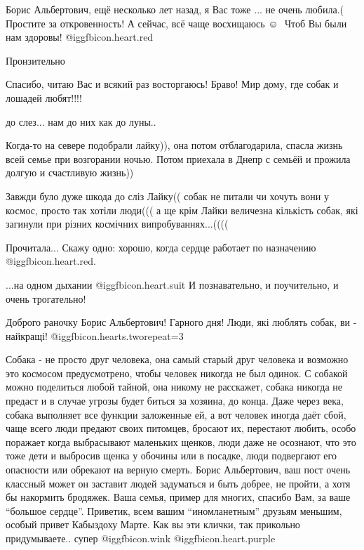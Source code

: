 \begin{itemize}

Борис Альбертович,
ещё несколько лет назад, я Вас тоже ...
не очень любила.(
Простите за откровенность!
А сейчас, всё чаще восхищаюсь ☺ ️ 
Чтоб Вы были нам здоровы!  @igg{fbicon.heart.red}

Пронзительно

Спасибо, читаю Вас и всякий раз восторгаюсь! Браво! Мир дому, где собак и лошадей любят!!!!

до слез... нам до них как до луны..


Когда-то на севере подобрали лайку)), она потом отблагодарила, спасла жизнь
всей семье при возгорании ночью. Потом приехала в Днепр с семьёй и прожила
долгую и счастливую жизнь))


Завжди було дуже шкода до сліз Лайку(( собак не питали чи хочуть вони у космос,
просто так хотіли люди((( а ще крім Лайки величезна кількість собак, які
загинули при різних космічних випробуваннях...((((


Прочитала...
Скажу одно: хорошо, когда сердце работает по назначению @igg{fbicon.heart.red}.

...на одном дыхании @igg{fbicon.heart.suit}
И познавательно, и поучительно, и очень трогательно!

Доброго раночку Борис Альбертович! Гарного дня! Люди, які люблять собак, ви - найкращі!  @igg{fbicon.hearts.two}{repeat=3} 


Собака - не просто друг человека, она самый старый друг человека и возможно это
космосом предусмотрено, чтобы человек никогда не был одинок. С собакой можно
поделиться любой тайной, она никому не расскажет, собака никогда не предаст и в
случае угрозы будет биться за хозяина, до конца. Даже через века, собака
выполняет все функции заложенные ей, а вот человек иногда даёт сбой, чаще всего
люди предают своих питомцев, бросают их, перестают любить, особо поражает когда
выбрасывают маленьких щенков, люди даже не осознают, что это тоже дети и выбросив
щенка у обочины или в посадке, люди подвергают его опасности или обрекают на
верную смерть. Борис Альбертович, ваш пост очень классный может он заставит
людей задуматься и быть добрее, не пройти, а хотя бы накормить бродяжек. Ваша
семья, пример для многих, спасибо Вам, за ваше \enquote{большое сердце}. Приветик, всем
вашим \enquote{иномланетным} друзьям меньшим, особый привет Кабыздоху Марте. Как вы эти
клички, так прикольно придумываете.. супер @igg{fbicon.wink}  @igg{fbicon.heart.purple} 


\end{itemize}

